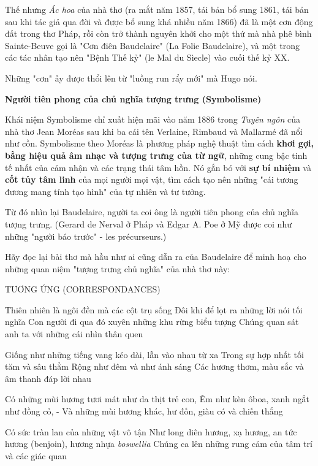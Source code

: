 \documentclass[../main.tex]{subfiles}
\begin{document}
\begin{multicols}{2}
Thế nhưng \textit{Ác hoa} của nhà thơ (ra mắt năm 1857, tái bản bổ sung 1861, tái bản sau khi tác giả qua đời và được bổ sung khá nhiều năm 1866) đã là một cơn động đất trong thơ Pháp, rồi còn trở thành nguyên khởi cho một thứ mà nhà phê bình Sainte-Beuve gọi là "Cơn điên Baudelaire" (La Folie Baudelaire), và một trong các tác nhân tạo nên "Bệnh Thế kỷ" (le Mal du Sìecle) vào cuối thế kỷ XX.  
 
Những "cơn" ấy được thổi lên từ "luồng run rẩy mới" mà Hugo nói. 
 
 
\textbf{Người tiên phong của chủ nghĩa tượng trưng (Symbolisme)} 
 
Khái niệm Symbolisme chỉ xuất hiện mãi vào năm 1886 trong \textit{Tuyên ngôn }của nhà thơ Jean Moréas sau khi ba cái tên Verlaine, Rimbaud và Mallarmé đã nổi như cồn. Symbolisme theo Moréas là phương pháp nghệ thuật tìm cách \textbf{khơi gợi, bằng hiệu quả âm nhạc và tượng trưng của từ ngữ}, những cung bậc tinh tế nhất của cảm nhận và các trạng thái tâm hồn. Nó gắn bó với \textbf{sự bí nhiệm }và \textbf{cốt tủy tâm linh }của mọi người mọi vật, tìm cách tạo nên những "cái tương đương mang tính tạo hình" của tự nhiên và tư tưởng.  
 
Từ đó nhìn lại Baudelaire, người ta coi ông là người tiên phong của chủ nghĩa tượng trưng. (Gerard de Nerval ở Pháp và Edgar A. Poe ở Mỹ được coi như những "người báo trước" - les précurseurs.) 
 
Hãy đọc lại bài thơ mà hầu như ai cũng dẫn ra của Baudelaire để minh hoạ cho những quan niệm "tượng trưng chủ nghĩa" của nhà thơ này: 
\begin{blockquote}
        
TƯƠNG ỨNG (CORRESPONDANCES) 
        
Thiên nhiên là ngôi đền mà các cột trụ sống        
Đôi khi để lọt ra những lời nói tối nghĩa         
Con người đi qua đó xuyên những khu rừng biểu tượng        
Chúng quan sát anh ta với những cái nhìn thân quen 
        
Giống như những tiếng vang kéo dài, lẫn vào nhau từ xa        
Trong sự hợp nhất tối tăm và sâu thẳm        
Rộng như đêm và như ánh sáng        
Các hương thơm, màu sắc và âm thanh đáp lời nhau 
        
Có những mùi hương tươi mát như da thịt trẻ con,        
Êm như kèn ôboa, xanh ngắt như đồng cỏ,        
- Và những mùi hương khác, hư đốn, giàu có và chiến thắng 
        
Có sức tràn lan của những vật vô tận        
Như long diên hương, xạ hương, an tức hương (benjoin), hương nhựa \textit{boswellia}        
Chúng ca lên những rung cảm của tâm trí và các giác quan  


\end{blockquote}
\end{multicols}
\end{document}
